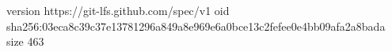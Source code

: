version https://git-lfs.github.com/spec/v1
oid sha256:03eca8c39c37e13781296a849a8e969e6a0bce13c2fefee0e4bb09afa2a8bada
size 463
